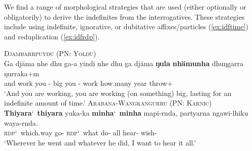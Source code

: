 \documentclass[12pt,egregdoesnotlikesansseriftitles]{scrartcl}
\begin{document}
We find a range of morphological strategies that are used (either optionally or obligatorily) to derive the indefinites from the interrogatives. These strategies include using indefinite, ignorative, or dubitative affixes/particles (\ref{ex:idftime}) and   reduplication (\ref{ex:idfrdp}). %
\begin{exe}
  \ex\label{ex:idftime} \textsc{Djambarrpuyŋu (PN: Yolŋu)}\hfill {}\\
  \gll %
  Ga djäma nhe dhu ga-a yindi nhe dhu ga djäma \textbf{ŋula} \textbf{nhämunha} dhuŋgarra ŋurraka$+$m\\
  and work you \Fut{} \Impv-\First{} big you \Fut{} \Impv-\First{} work  how.many year throw$+$\First\\
  \glt `And you are working, you are working (on something) big, lasting for an indefinite amount of time.'
  \ex\label{ex:idfrdp} \textsc{Arabana-Wangkangurru (PN: Karnic)}\hfill {}\\
  \gll \textbf{Thiyara}\char`~\textbf{thiyara} yuka-ka \textbf{minha}\char`~\textbf{minha} mapi-rnda, partyarna ngawi-lhiku waya-rnda.\\
  \textsc{rdp}\char`~which.way go-\Pst{} \textsc{rdp}\char`~what do-\Prs{} all hear-\Purp{} wish-\Prs\\
  \glt `Wherever he went and whatever he did, I want to hear it all.' %
\end{exe}
\end{document}
